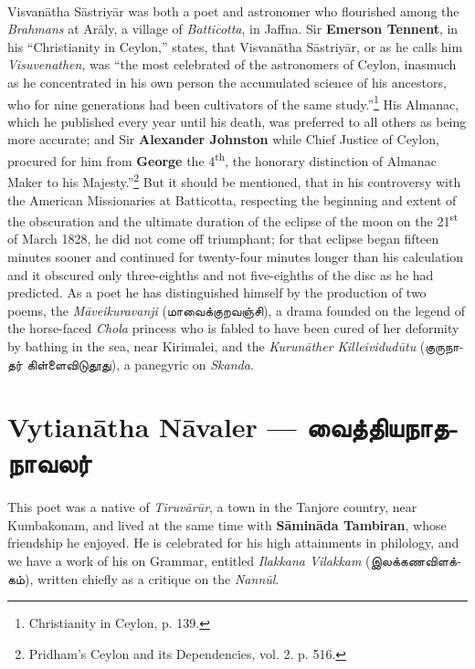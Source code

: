 \documentclass{article}
\newcommand{\TamilText}[1]{\texttamil{#1}}
\newcommand{\TamilBold}[1]{\texttamil{\textbf{#1}}}
\newcommand{\tam}[1]{\TamilText{#1}}
\newcommand{\tambold}[1]{\TamilBold{#1}}
\begin{document}
\paragraph{}
Visvan\={a}tha S\={a}striy\={a}r was both a poet and astronomer who flourished among the \emph{Brahmans} at Ar\={a}ly, a village of \emph{Batticotta}, in Jaffna. Sir \textbf{Emerson Tennent}, in his ``Christianity in Ceylon,'' states, that Visvan\={a}tha S\={a}striy\={a}r, or as he calls him \emph{Visuvenathen}, was ``the most celebrated of the astronomers of Ceylon, inasmuch as he concentrated in his own person the accumulated science of his ancestors, who for nine generations had been cultivators of the same study.''\footnote{Christianity in Ceylon, p. 139.} His Almanac, which he published every year until his death, was preferred to all others as being more accurate; and Sir \textbf{Alexander Johnston} while Chief Justice of Ceylon, procured for him from \textbf{George} the 4\textsuperscript{th}, the honorary distinction of Almanac Maker to his Majesty.''\footnote{Pridham's Ceylon and its Dependencies, vol. 2. p. 516.} But it should be mentioned, that in his controversy with the American Missionaries at Batticotta, respecting the beginning and extent of the obscuration and the ultimate duration of the eclipse of the moon on the 21\textsuperscript{st} of March 1828, he did not come off triumphant; for that eclipse began fifteen minutes sooner and continued for twenty-four minutes longer than his calculation and it obscured only three-eighths and not five-eighths of the disc as he had predicted. As a poet he has distinguished himself by the production of two poems, the \emph{M\={a}veikuravanji} (\tam{மாவைக்குறவஞ்சி}), a drama founded on the legend of the horse-faced \emph{Chola} princess who is fabled to have been cured of her deformity by bathing in the sea, near Kirimalei, and the \emph{Kurun\={a}ther Killeividud\={u}tu} (\tam{குருநாதர் கிள்ளைவிடுதூது}), a panegyric on \emph{Skanda}.

\section{Vytian\={a}tha N\={a}valer --- \tambold{வைத்தியநாதநாவலர்}}
\paragraph{}
This poet was a native of \emph{Tiruv\={a}r\={u}r}, a town in the Tanjore country, near Kumbakonam, and lived at the same time with \textbf{S\={a}min\={a}da Tambiran}, whose friendship he enjoyed. He is celebrated for his high attainments in philology, and we have a work of his on Grammar, entitled \emph{Ilakkana Vilakkam} (\tam{இலக்கணவிளக்கம்}), written chiefly as a critique on the \emph{Nann\={u}l}.
\end{document}
